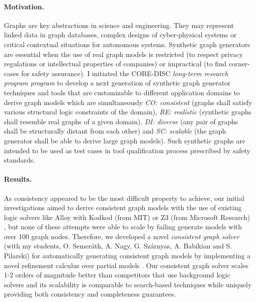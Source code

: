 \paragraph{Motivation.}
Graphs are key abstractions in science and engineering. They may represent linked data in graph databases, complex designs of cyber-physical systems or critical contextual situations for autonomous systems. Synthetic graph generators are essential when the use of real graph models is restricted (to respect privacy regulations or intellectual properties of companies) or impractical (to find corner-cases for safety assurance). I initiated the CORE-DISC \emph{long-term research program program} \cite{fmhe2018} to develop a next generation of synthetic graph generator techniques and tools that are customizable to different application domains to derive graph models which are simultaneously \emph{CO: consistent} (graphs shall satisfy various structural logic constraints of the domain), \emph{RE: realistic} (synthetic graphs shall resemble real graphs of a given domain), \emph{DI: diverse} (any pair of graphs shall be structurally distant from each other) and \emph{SC: scalable} (the graph generator shall be able to derive large graph models). Such synthetic graphs are intended to be used as test cases in tool qualification process prescribed by safety standards.%

\paragraph{Results.} 
As consistency appeared to be the most difficult property to achieve, our initial investigations \cite{fase2016-solver,sosym2017-dsl} aimed to derive consistent graph models with the use of existing logic solvers like Alloy with Kodkod (from MIT) \cite{Torlak2007} or Z3 (from Microsoft Research) \cite{Moura-tacas2008}, but none of these attempts were able to scale by failing generate models with over 100 graph nodes. Therefore, we developed a novel \emph{consistent graph solver} \cite{icse2018-solver,icse2019-tool}(with my students, O. Semeráth, A. Nagy, G. Szárnyas, A. Babikian and S. Pilarski) for automatically generating consistent graph models by implementing a novel refinement calculus over partial models \cite{fmhe2018}. Our consistent graph solver \cite{icse2018-solver,icse2019-tool} scales 1-2 orders of magnitude better than competitors that use background logic solvers and its scalability is comparable to search-based techniques \cite{Soltana2017} while uniquely providing both consistency and completeness guarantees. 


